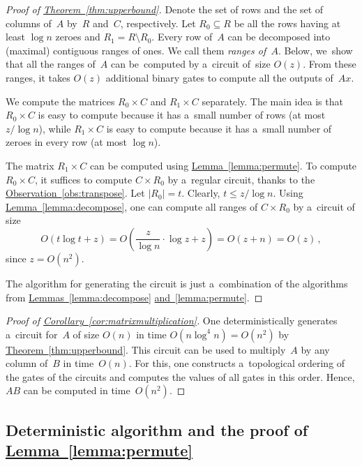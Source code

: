 \documentclass[11pt]{article}
\numberwithin{equation}{section}
\theoremstyle{definition}
\theoremstyle{plain}
\newcommand{\expref}[2]{\hyperref[#2]{#1~\ref{#2}}}
\theoremstyle{plain}\newtheorem{observation}[theorem]{Observation}
\begin{document}
\begin{proof}[Proof of {\expref{Theorem}{thm:upperbound}}]
Denote the set of rows and the set of columns of~$A$ by~$R$
and~$C$, respectively. Let $R_0 \subseteq R$ be all the rows
having at least $\log n$ zeroes and $R_1=R \setminus R_0$.
Every row of~$A$ can be decomposed into (maximal) contiguous ranges of ones. We
call them \emph{ranges of~$A$}.
Below, we~show that all the ranges of~$A$
can be~computed by a~circuit of~size $O(z)$.
From these
ranges, it takes $O(z)$ additional binary gates to compute all the outputs of~$Ax$.

We compute the matrices $R_0 \times C$ and $R_1 \times C$
separately. The main idea is that $R_0 \times C$ is easy to compute
because it has a~small number of rows (at most $z/\log n$), while $R_1 \times C$
is easy to compute because it has a~small number of zeroes in every row (at most
$\log n$).

The matrix $R_1 \times C$ can be computed using \expref{Lemma}{lemma:permute}. To
compute $R_0 \times C$, it suffices to compute $C \times R_0$ by a~regular
circuit, thanks to the \expref{Observation}{obs:transpose}.
Let $|R_0|=t$. Clearly, $t \le z/\log n$.
Using \expref{Lemma}{lemma:decompose}, one can compute all
ranges of $C \times R_0$ by a~circuit of size
\[O(t\log t+z)=O\left(\frac{z}{\log n} \cdot \log z+z\right)=O(z+n)=O(z)\, ,\]
since $z =O(n^2)$.

The algorithm for generating the circuit is just a~combination
of the algorithms from \expref{Lemmas}{lemma:decompose} \expref{and}{lemma:permute}.
\end{proof}

\begin{proof}[Proof of {\expref{Corollary}{cor:matrixmultiplication}}]
	One deterministically generates a~circuit for~$A$ of size $O(n)$ in time
	$O(n\log^4n)=O(n^2)$ by \expref{Theorem}{thm:upperbound}.
	This circuit can be used to multiply~$A$ by any column of~$B$
	in time~$O(n)$. For this, one constructs a~topological ordering of the gates of
	the circuits and computes the values of all gates in this order. Hence, $AB$ can
	be computed in time~$O(n^2)$.
\end{proof}


\subsection{Deterministic algorithm and the proof of \expref{Lemma}{lemma:permute}}\label{sec:deterministic}
\end{document}
